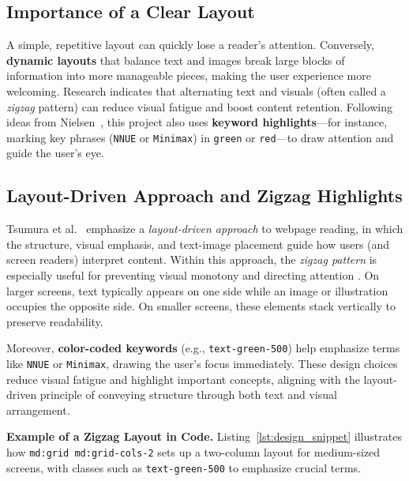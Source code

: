 \documentclass[12pt,a4paper]{article}
\begin{document}
\subsection{Importance of a Clear Layout}
A simple, repetitive layout can quickly lose a reader’s attention. 
Conversely, \textbf{dynamic layouts} that balance text and images 
break large blocks of information into more manageable pieces, 
making the user experience more welcoming. Research indicates 
\cite{dombrowski2008layout} that alternating text and visuals 
(often called a \emph{zigzag} pattern) can reduce visual fatigue 
and boost content retention. Following ideas from 
Nielsen~\cite{nielsen2006usability}, this project also uses 
\textbf{keyword highlights}—for instance, marking key phrases 
(\texttt{NNUE} or \texttt{Minimax}) in \texttt{green} or 
\texttt{red}—to draw attention and guide the user’s eye.

\subsection{Layout-Driven Approach and Zigzag Highlights}
Tsumura et al.~\cite{tsumura2022layout} emphasize a \emph{layout-driven approach} 
to webpage reading, in which the structure, visual emphasis, and text-image 
placement guide how users (and screen readers) interpret content. 
Within this approach, the \emph{zigzag pattern} is especially useful 
for preventing visual monotony and directing attention . 
On larger screens, text typically appears on one side while an image 
or illustration occupies the opposite side. On smaller screens, 
these elements stack vertically to preserve readability.

Moreover, \textbf{color-coded keywords} (e.g., \texttt{text-green-500}) 
help emphasize terms like \texttt{NNUE} or \texttt{Minimax}, 
drawing the user’s focus immediately. These design choices reduce 
visual fatigue and highlight important concepts, aligning with the 
layout-driven principle of conveying structure through both text 
and visual arrangement.

\vspace{1em}
\noindent
\textbf{Example of a Zigzag Layout in Code.}  
Listing~\ref{lst:design_snippet} illustrates how 
\texttt{md:grid md:grid-cols-2} sets up a two-column 
layout for medium-sized screens, with classes such 
as \texttt{text-green-500} to emphasize crucial terms.
\end{document}

